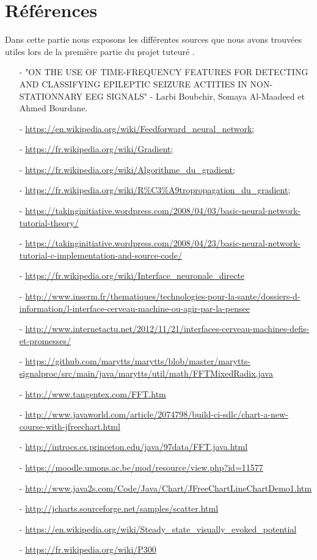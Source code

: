 \part{Références} %
\label{prt:référence_}
Dans cette partie nous exposons les différentes sources que nous avons trouvées utiles lors de la première partie du projet tuteuré .

\begin{itemize}
	\item [-] "ON THE USE OF TIME-FREQUENCY FEATURES FOR DETECTING AND CLASSIFYING EPILEPTIC SEIZURE ACTITIES IN NON-STATIONNARY EEG SIGNALS" - Larbi Boubchir, Somaya Al-Maadeed et Ahmed Bourdane. 
  	\item [-] \url{https://en.wikipedia.org/wiki/Feedforward_neural_network;}
  	\item [-] \url{https://fr.wikipedia.org/wiki/Gradient;}
  	\item [-] \url{https://fr.wikipedia.org/wiki/Algorithme_du_gradient;}
  	\item [-] \url{https://fr.wikipedia.org/wiki/R\%C3\%A9tropropagation_du_gradient;}
  	\item [-] \url{https://takinginitiative.wordpress.com/2008/04/03/basic-neural-network-tutorial-theory/}
  	\item [-] \url{https://takinginitiative.wordpress.com/2008/04/23/basic-neural-network-tutorial-c-implementation-and-source-code/}
  	\item [-] \url{https://fr.wikipedia.org/wiki/Interface_neuronale_directe}
  	\item [-] \url{http://www.inserm.fr/thematiques/technologies-pour-la-sante/dossiers-d-information/l-interface-cerveau-machine-ou-agir-par-la-pensee}
  	\item [-] \url{http://www.internetactu.net/2012/11/21/interfaces-cerveau-machines-defis-et-promesses/}
  	\item [-] \url{https://github.com/marytts/marytts/blob/master/marytts-signalproc/src/main/java/marytts/util/math/FFTMixedRadix.java}
  	\item [-] \url{http://www.tangentex.com/FFT.htm}
  	\item [-] \url{http://www.javaworld.com/article/2074798/build-ci-sdlc/chart-a-new-course-with-jfreechart.html}
  	\item [-] \url{http://introcs.cs.princeton.edu/java/97data/FFT.java.html}
  	\item [-] \url{https://moodle.umons.ac.be/mod/resource/view.php?id=11577}
  	\item [-] \url{http://www.java2s.com/Code/Java/Chart/JFreeChartLineChartDemo1.htm}
  	\item [-] \url{http://jcharts.sourceforge.net/samples/scatter.html}
  	\item [-] \url{https://en.wikipedia.org/wiki/Steady_state_visually_evoked_potential}
  	\item [-] \url{https://fr.wikipedia.org/wiki/P300}
  \end{itemize}  
